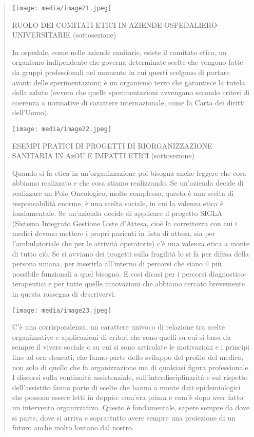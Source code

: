 \documentclass[]{article}
\begin{document}
\begin{quote}
\texttt{[image: media/image21.jpeg]}

RUOLO DEI COMITATI ETICI IN AZIENDE OSPEDALIERO-UNIVERSITARIE
(sottosezione)

In ospedale, come nelle aziende sanitarie, esiste il comitato etico, un
organismo indipendente che governa determinate scelte che vengono fatte
da gruppi professionali nel momento in cui questi scelgono di portare
avanti delle sperimentazioni; è un organismo terzo che garantisce la
tutela della salute (ovvero che quelle sperimentazioni avvengano secondo
criteri di coerenza a normative di carattere internazionale, come la
Carta dei diritti dell'Uomo).

\texttt{[image: media/image22.jpeg]}

ESEMPI PRATICI DI PROGETTI DI RIORGANIZZAZIONE SANITARIA IN AzOU E
IMPATTI ETICI (sottosezione)

Quando si fa etica in un'organizzazione poi bisogna anche leggere che
cosa abbiamo realizzato e che cosa stiamo realizzando. Se un'azienda
decide di realizzare un Polo Oncologico, molto complesso, questa è una
scelta di responsabilità enorme, è una scelta sociale, in cui la valenza
etica è fondamentale. Se un'azienda decide di applicare il progetto
SIGLA (Sistema Integrato Gestione Liste d'Attesa, cioè la correttezza
con cui i medici devono mettere i propri pazienti in lista di attesa,
sia per l'ambulatoriale che per le attività operatorie) c'è una valenza
etica a monte di tutto ciò. Se si avviano dei progetti sulla fragilità
lo si fa per difesa della persona umana, per inserirla all'interno di
percorsi che siano il più possibile funzionali a quel bisogno. E cosi
dicasi per i percorsi diagnostico-terapeutici e per tutte quelle
innovazioni che abbiamo cercato brevemente in questa rassegna di
descrivervi.

\texttt{[image: media/image23.jpeg]}

C'è una corrispondenza, un carattere univoco di relazione tra scelte
organizzative e applicazioni di criteri che sono quelli su cui si basa
da sempre il vivere sociale o su cui si sono articolate le motivazioni e
i principi fino ad ora elencati, che fanno parte dello sviluppo del
profilo del medico, non solo di quello che fa organizzazione ma di
qualsiasi figura professionale. I discorsi sulla continuità
assistenziale, sull'interdisciplinarità e sul rispetto dell'assistito
fanno parte di scelte che hanno a monte dati epidemiologici che possono
essere letti in doppio: com'era prima e com'è dopo aver fatto un
intervento organizzativo. Questo è fondamentale, sapere sempre da dove
si parte, dove si arriva e soprattutto avere sempre una proiezione di un
futuro anche molto lontano dal nostro.


\end{quote}
\end{document}
